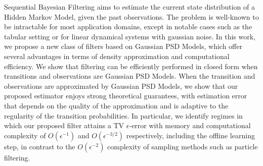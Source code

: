 Sequential Bayesian Filtering aims to estimate the current state distribution of a Hidden Markov Model, given the past observations. The problem is well-known to be intractable for most application domains, except in notable cases such as the tabular setting or for linear dynamical systems with gaussian noise. In this work, we propose a new class of filters based on Gaussian PSD Models, which offer several advantages in terms of density approximation and computational efficiency. We show that filtering can be efficiently performed in closed form when transitions and observations are Gaussian PSD Models. When the transition and observations are approximated by Gaussian PSD Models, we show that our proposed estimator enjoys strong theoretical guarantees, with estimation error that depends on the quality of the approximation and is adaptive to the regularity of the transition probabilities.  In particular, we identify regimes in which our proposed filter attains a TV $\epsilon$-error with memory and computational complexity of $O(\epsilon^{-1})$ and $O(\epsilon^{-3/2})$ respectively, including the offline learning step, in contrast to the $O(\epsilon^{-2})$ complexity of sampling methods such as particle filtering.